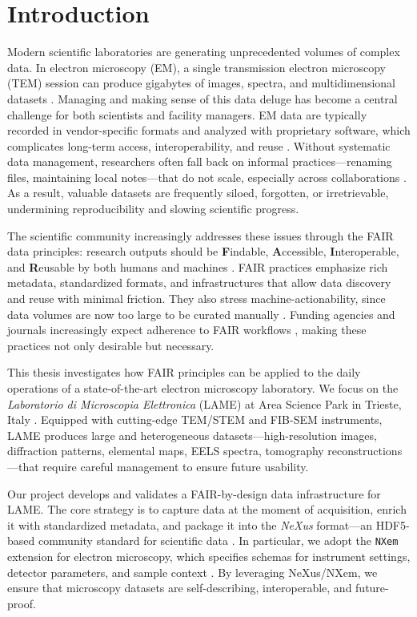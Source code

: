 \chapter{Introduction}

Modern scientific laboratories are generating unprecedented volumes of complex data. 
In electron microscopy (EM), a single transmission electron microscopy (TEM) session can produce gigabytes of images, spectra, and multidimensional datasets \parencite{Poger2023BigDataEM}. 
Managing and making sense of this data deluge has become a central challenge for both scientists and facility managers. 
EM data are typically recorded in vendor-specific formats and analyzed with proprietary software, which complicates long-term access, interoperability, and reuse \parencite{Moore2021OMENGFF}. 
Without systematic data management, researchers often fall back on informal practices—renaming files, maintaining local notes—that do not scale, especially across collaborations \parencite{Korir2024TenRecs}. 
As a result, valuable datasets are frequently siloed, forgotten, or irretrievable, undermining reproducibility and slowing scientific progress.

The scientific community increasingly addresses these issues through the FAIR data principles: research outputs should be \textbf{F}indable, \textbf{A}ccessible, \textbf{I}nteroperable, and \textbf{R}eusable by both humans and machines \parencite{Wilkinson2016FAIR,GOFAIRPrinciples}. 
FAIR practices emphasize rich metadata, standardized formats, and infrastructures that allow data discovery and reuse with minimal friction. 
They also stress machine-actionability, since data volumes are now too large to be curated manually \parencite{Wilkinson2016FAIR}. 
Funding agencies and journals increasingly expect adherence to FAIR workflows \parencite{EC2018TurningFAIR,EC2021HEGuide}, making these practices not only desirable but necessary.

This thesis investigates how FAIR principles can be applied to the daily operations of a state-of-the-art electron microscopy laboratory. 
We focus on the \textit{Laboratorio di Microscopia Elettronica} (LAME) at Area Science Park in Trieste, Italy \parencite{AreaLAME}. 
Equipped with cutting-edge TEM/STEM and FIB-SEM instruments, LAME produces large and heterogeneous datasets—high-resolution images, diffraction patterns, elemental maps, EELS spectra, tomography reconstructions—that require careful management to ensure future usability. 

Our project develops and validates a FAIR-by-design data infrastructure for LAME. 
The core strategy is to capture data at the moment of acquisition, enrich it with standardized metadata, and package it into the \textit{NeXus} format—an HDF5-based community standard for scientific data \parencite{Konnecke2015NeXus}. 
In particular, we adopt the \texttt{NXem} extension for electron microscopy, which specifies schemas for instrument settings, detector parameters, and sample context \parencite{NXemManual,NXemFAIRmat}. 
By leveraging NeXus/NXem, we ensure that microscopy datasets are self-describing, interoperable, and future-proof. 

